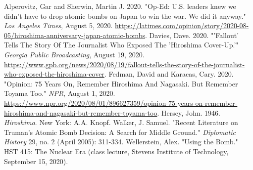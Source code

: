 \documentclass[12pt]{turabian-researchpaper}
\begin{document}
\newpage

\begin{thebibliography}{6}
	 Alperovitz, Gar and Sherwin, Martin J. 2020. "Op-Ed: U.S. leaders knew we didn’t have to drop atomic bombs on Japan to win the war. We did it anyway." \textit{Los Angeles Times}, August 5, 2020. 
	\url{https://latimes.com/opinion/story/2020-08-05/hiroshima-anniversary-japan-atomic-bombs}.
	 Davies, Dave. 2020. "'Fallout' Tells The Story Of The Journalist Who Exposed The 'Hiroshima Cover-Up.'" \textit{Georgia Public Broadcasting}, August 19, 2020. \url{https://www.gpb.org/news/2020/08/19/fallout-tells-the-story-of-the-journalist-who-exposed-the-hiroshima-cover}.
	 Fedman, David and Karacas, Cary. 2020. "Opinion: 75 Years On, Remember Hiroshima And Nagasaki. But Remember Toyama Too." \textit{NPR}, August 1, 2020. \url{https://www.npr.org/2020/08/01/896627359/opinion-75-years-on-remember-hiroshima-and-nagasaki-but-remember-toyama-too}.
	 Hersey, John. 1946. \textit{Hiroshima}. New York: A.A. Knopf.
	 Walker, J. Samuel. "Recent Literature on Truman's Atomic Bomb Decision: A Search for Middle Ground." \textit{Diplomatic History} 29, no. 2 (April 2005): 311-334.
	 Wellerstein, Alex. "Using the Bomb." HST 415: The Nuclear Era (class lecture, Stevens Institute of Technology, September 15, 2020).
\end{thebibliography}
\end{document}
